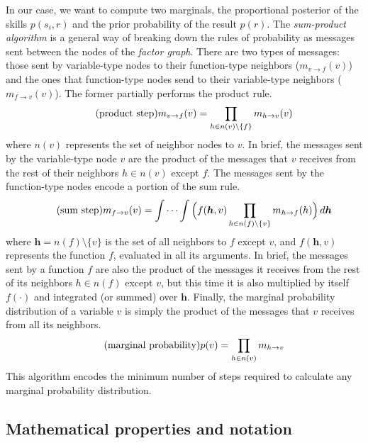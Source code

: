 \documentclass[article]{jss}
\begin{document}
%
In our case, we want to compute two marginals, the proportional posterior of the skills $p(s_i, r)$ and the prior probability of the result $p(r)$. 
The \emph{sum-product algorithm} is a general way of breaking down the rules of probability as messages sent between the nodes of the \emph{factor graph}. 
There are two types of messages: those sent by variable-type nodes to their function-type neighbors ($m_{v \rightarrow f}(v)$) and the ones that function-type nodes send to their variable-type neighbors ($m_{f \rightarrow v}(v)$). 
The former partially performs the product rule. 
%
\begin{equation*}\label{eq:m_v_f} \tag{\text{product step}}
m_{v \rightarrow f}(v) = \prod_{h \in n(v) \setminus \{f\} } m_{h \rightarrow v}(v)
\end{equation*}
%
where $n(v)$ represents the set of neighbor nodes to $v$. 
In brief, the messages sent by the variable-type node $v$ are the product of the messages that $v$ receives from the rest of their neighbors $h \in n(v)$ except $f$. 
The messages sent by the function-type nodes encode a portion of the sum rule. 
%
\begin{equation*}\label{eq:m_f_v}  \tag{\text{sum step}}
m_{f \rightarrow v}(v) = \int \cdots \int \Big( f(\bm{h},v) \prod_{h \in n(f) \setminus \{v\} } m_{h \rightarrow f}(h) \Big) \,  d\bm{h}
\end{equation*}
%
where $\bm{h} = n(f)\setminus \{v\}$ is the set of all neighbors to $f$ except $v$, and $f(\bm{h},v)$ represents the function $f$, evaluated in all its arguments. 
In brief, the messages sent by a function $f$ are also the product of the messages it receives from the rest of its neighbors $h \in n(f)$ except $v$, but this time it is also multiplied by itself $f(\cdot)$ and integrated (or summed) over $\bm{h}$. 
Finally, the marginal probability distribution of a variable $v$ is simply the product of the messages that $v$ receives from all its neighbors. 
%
\begin{equation*}\label{eq:marginal}  \tag{\text{marginal probability}}
p(v) = \prod_{h \in n(v)} m_{h \rightarrow v}
\end{equation*}
%
This algorithm encodes the minimum number of steps required to calculate any marginal probability distribution. 

\subsection{Mathematical properties and notation}\label{sec:propiedades}
\end{document}
